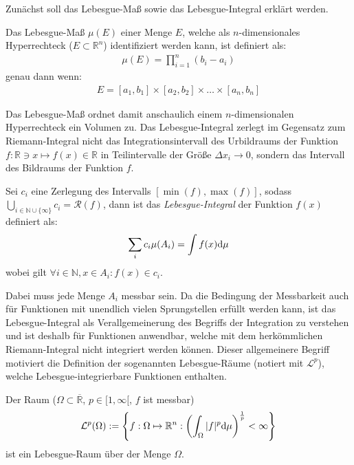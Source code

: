 Zunächst soll das Lebesgue-Maß sowie das Lebesgue-Integral erklärt werden. 
\begin{Definitionbox}[]
    Das Lebesgue-Maß $\mu(E)$ einer Menge $E$, welche als $n$-dimensionales Hyperrechteck ($E\subset \mathbb{R}^n$) identifiziert werden kann, ist definiert als:
    \begin{align*}
        \mu(E)= \prod_{i=1}^{n}{(b_i - a_i)}
    \end{align*}
    genau dann wenn:
    \begin{align*}
        E=[a_1 , b_1] \times [a_2 , b_2] \times \ldots \times [a_n , b_n]
    \end{align*}
\end{Definitionbox}
Das Lebesgue-Maß ordnet damit anschaulich einem $n$-dimensionalen Hyperrechteck ein Volumen zu.
Das Lebesgue-Integral zerlegt im Gegensatz zum Riemann-Integral nicht das Integrationsintervall des Urbildraums der Funktion $f:\mathbb{R} \ni x \mapsto f(x)\in \mathbb{R}$ in Teilintervalle der Größe $\Delta x_i \to 0$, sondern das Intervall des Bildraums der Funktion $f$.
\begin{Definitionbox}[]
    Sei $c_i$ eine Zerlegung des Intervalls $[\min(f),\max(f)]$, sodass $\bigcup_{i\in \mathbb{N}\cup \{\infty\}}c_i = \mathscr{R}(f)$, dann ist das \emph{Lebesgue-Integral} der Funktion $f(x)$ definiert als:
    \begin{align*}
        \sum_{i}{c_i \mu(A_i)} = \int{f(x) \text{d}{\mu}}
    \end{align*}
    wobei gilt $\forall i \in \mathbb{N},x\in A_i : f(x)\in c_i$.


\end{Definitionbox}
Dabei muss jede Menge $A_i$ messbar sein. 
Da die Bedingung der Messbarkeit auch für Funktionen mit unendlich vielen Sprungstellen erfüllt werden kann, ist das Lebesgue-Integral als Verallgemeinerung des Begriffs der Integration zu verstehen und ist deshalb für Funktionen anwendbar, welche mit dem herkömmlichen Riemann-Integral nicht integriert werden können. Dieser allgemeinere Begriff motiviert die Definition der sogenannten Lebesgue-Räume (notiert mit $\mathcal{L}^p$), welche Lebesgue-integrierbare Funktionen enthalten.
\begin{Definitionbox}[]
    Der Raum ($\Omega \subset \overline{\mathbb{R}}$, $p\in [1,\infty[$, $f$ ist messbar)
    \begin{align*}
        \mathcal{L}^p (\Omega) := \left\{f:\Omega \mapsto \mathbb{R}^{n} : \left(\int_{\Omega}{|f|^{p}\text{d}{\mu}} \right)^{\frac{1}{p}}< \infty \right\}
    \end{align*}
    ist ein Lebesgue-Raum über der Menge $\Omega$.
\end{Definitionbox}
